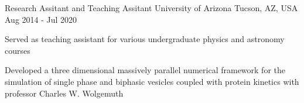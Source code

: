
  \cventry
    {Research Assitant and Teaching Assitant} %
    {University of Arizona} %
    {Tucson, AZ, USA} %
    {Aug 2014 - Jul 2020} %
    {
      \begin{cvitems} %
         \item {Served as teaching assistant for various undergraduate physics and astronomy courses}
         \item {Developed a three dimensional massively parallel numerical framework for the simulation of single phase and biphasic vesicles coupled with protein kinetics with professor Charles W. Wolgemuth}
      \end{cvitems}
    }
